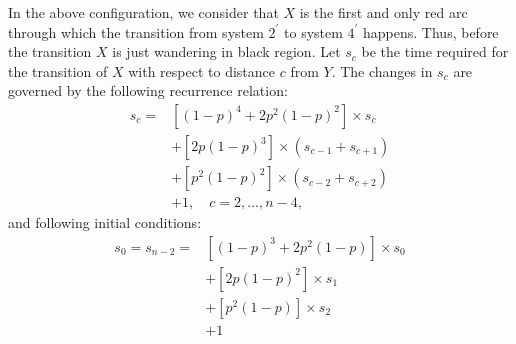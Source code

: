 \documentclass[]{book}
\theoremstyle{definition}
\begin{document}
In the above configuration, we consider that $X$ is the first and only red arc through which the transition from system $2^\prime$ to system $4^\prime$ happens. Thus, before the transition $X$ is just wandering in black region. Let $s_c$ be the time required for the transition of $X$ with respect to distance $c$ from $Y$. The changes in $s_c$ are governed by the following recurrence relation:
\begin{equation}
\begin{split}
    s_c 
    =& \left[ \left( 1-p \right) ^ 4 + 2p^2 \left( 1-p \right)^2 \right]\times s_c \\
    &+\left[ 2p \left( 1-p \right) ^ 3 \right]\times \left( s_{c-1} + s_{c+1} \right) \\
    &+\left[ p^2\left( 1-p \right)^2 \right]\times \left( s_{c-2} + s_{c+2} \right) \\
    &+1, \quad c = 2,\ldots,n-4,
\end{split}
\end{equation}
and following initial conditions:
\begin{equation}
\begin{split}
    s_0 =s_{n-2} 
    =&\left[ \left( 1-p \right)^3 + 2p^2\left( 1-p \right) \right]\times s_0 \\
    &+\left[ 2p\left( 1-p \right)^2 \right]\times s_1 \\
    &+\left[p^2\left( 1-p \right) \right]\times s_2 \\
    &+1
\end{split}
\end{equation}
\end{document}
